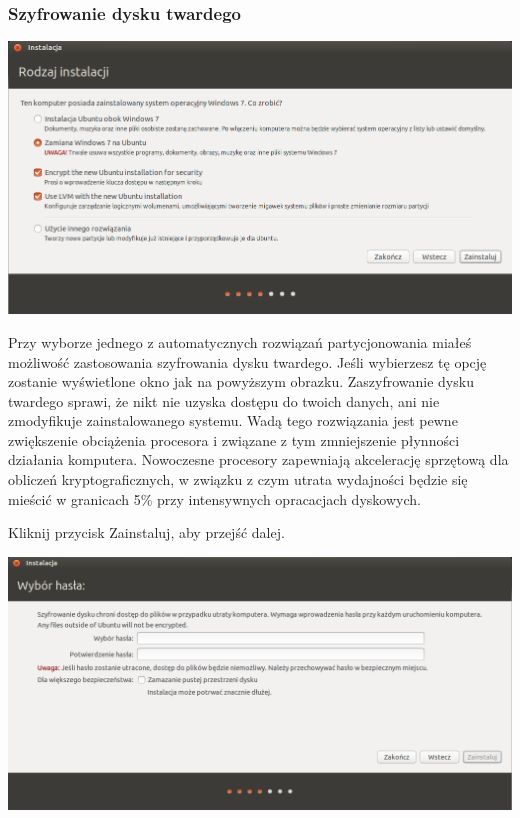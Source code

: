 \subsubsection{Szyfrowanie dysku twardego}
\begin{center}
        \includegraphics[width=\linewidth]{images/instalator_partycjonowanie_szyfrowanie1.png}
\end{center}

Przy wyborze jednego z automatycznych rozwiązań partycjonowania miałeś możliwość zastosowania szyfrowania dysku twardego. Jeśli wybierzesz tę opcję zostanie wyświetlone okno jak na powyższym obrazku. Zaszyfrowanie dysku twardego sprawi, że nikt nie uzyska dostępu do twoich danych, ani nie zmodyfikuje zainstalowanego systemu. Wadą tego rozwiązania jest pewne zwiększenie obciążenia procesora i związane z tym zmniejszenie płynności działania komputera. Nowoczesne procesory zapewniają akcelerację sprzętową dla obliczeń kryptograficznych, w związku z czym utrata wydajności będzie się mieścić w granicach 5\% przy intensywnych opracacjach dyskowych.
\begin{flushright}
Kliknij przycisk \textcolor{ubuntu_orange}{Zainstaluj}, aby przejść dalej.
\end{flushright}

\begin{center}
        \includegraphics[width=\linewidth]{images/instalator_partycjonowanie_szyfrowanie2.png}
\end{center}


